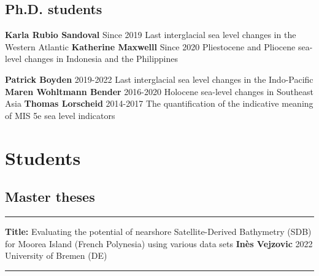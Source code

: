 \documentclass[%
               doublesided,
               paper=a4,
               fontsize=10pt
              ]{my-resume}
\begin{document}
{    \subsection{Ph.D. students}
      \publication
	{} %
	{\textbf{Karla Rubio Sandoval}} %
	{Since 2019} %
	{Last interglacial sea level changes in the Western Atlantic} %
	{} %
	 \publication
	{} %
	{\textbf{Katherine Maxwelll}} %
	{Since 2020} %
	{Pliestocene and Pliocene sea-level changes in Indonesia and the Philippines} %
	{} %

        \publication
	{} %
        {\textbf{Patrick Boyden}} %
	{2019-2022} %
	{Last interglacial sea level changes in the Indo-Pacific} %
	{} %
        \publication
	{} %
        {\textbf{Maren Wohltmann Bender}} %
	{2016-2020} %
	{Holocene sea-level changes in Southeast Asia} %
	{} %
         \publication
	{} %
        {\textbf{Thomas Lorscheid}} %
	{2014-2017} %
	{The quantification of the indicative meaning of MIS 5e sea level indicators} %
	{} %
	
	
}       
\makebody
\clearpage

\pagestyle{empty}
    \section[\faCompass]{Students}
    \subsection{Master theses}
    \setlength{\pubdatelength}{0.25 \linewidth}

\smallskip
\hrule
\smallskip

    \publication
	{\textbf{Title:} Evaluating the potential of nearshore Satellite-Derived Bathymetry (SDB) for Moorea Island (French Polynesia) using various data sets} %
	{\textbf{Inès Vejzovic}} %
	{2022} %
	{University of Bremen (DE)} %
	{} %

\smallskip
\hrule
\smallskip
    
\end{document}
